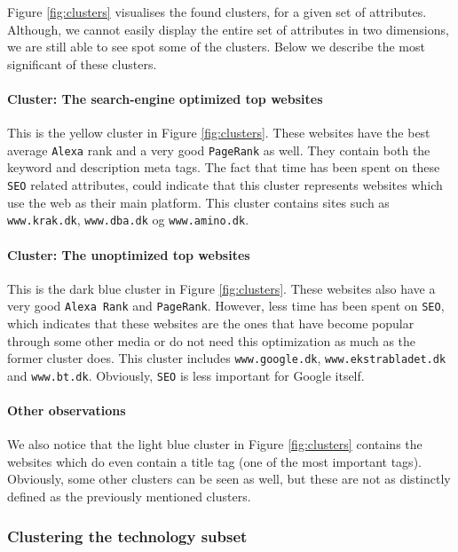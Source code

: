 Figure \ref{fig:clusters} visualises the found clusters, for a given set of attributes. Although, we cannot easily display the entire set of attributes in two dimensions, we are still able to see spot some of the clusters. Below we describe the most significant of these clusters.

\paragraph{Cluster: The search-engine optimized top websites}

This is the yellow cluster in Figure \ref{fig:clusters}. These websites have the best average \texttt{Alexa} rank and a very good \texttt{PageRank} as well. They contain both the keyword and description meta tags. The fact that time has been spent on these \texttt{SEO} related attributes, could indicate that this cluster represents websites which use the web as their main platform. This cluster contains sites such as \verb|www.krak.dk|, \verb|www.dba.dk| og \verb|www.amino.dk|.

\paragraph{Cluster: The unoptimized top websites}

This is the dark blue cluster in Figure \ref{fig:clusters}. These websites also have a very good \texttt{Alexa Rank} and \texttt{PageRank}. However, less time has been spent on \texttt{SEO}, which indicates that these websites are the ones that have become popular through some other media or do not need this optimization as much as the former cluster does. This cluster includes \verb|www.google.dk|, \verb|www.ekstrabladet.dk| and \verb|www.bt.dk|. Obviously, \texttt{SEO} is less important for Google itself.

\paragraph{Other observations} We also notice that the light blue cluster in Figure \ref{fig:clusters} contains the websites which do even contain a title tag (one of the most important tags). Obviously, some other clusters can be seen as well, but these are not as distinctly defined as the previously mentioned clusters.

\subsubsection{Clustering the technology subset}

